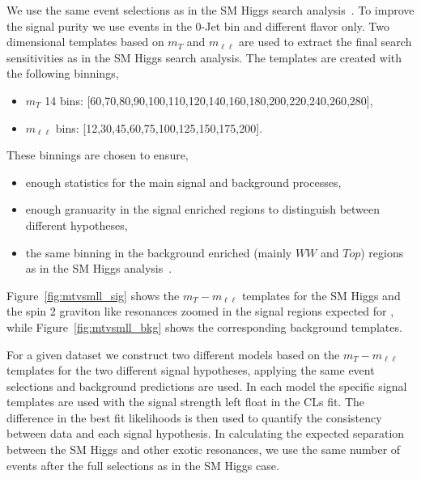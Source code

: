 We use the same event selections as in the SM Higgs search 
analysis~\cite{HWWHCP2012}. To improve the signal purity 
we use events in the 0-Jet bin and different flavor only. 
Two dimensional templates based on $m_T$ and $m_{\ell\ell}$ 
are used to extract the final search sensitivities as in the 
SM Higgs search analysis.
The templates are created with the following binnings,
\begin{itemize}
\item $m_T$ 14 bins: [60,70,80,90,100,110,120,140,160,180,200,220,240,260,280],
\item $m_{\ell\ell}$ bins: [12,30,45,60,75,100,125,150,175,200].
\end{itemize}
These binnings are chosen to ensure, 
\begin{itemize}
\item enough statistics for the main signal and background processes, 
\item enough granuarity in the signal enriched regions to distinguish between 
different hypotheses, 
\item the same binning in the background enriched (mainly $WW$ and $Top$) regions 
as in the SM Higgs analysis~\cite{HWWHCP2012}. 
\end{itemize}
Figure~\ref{fig:mtvsmll_sig} shows the $m_T-m_{\ell\ell}$ templates for the SM Higgs 
and the spin 2 graviton like resonances zoomed in the signal regions expected for \intlumiEightTeV, while 
Figure~\ref{fig:mtvsmll_bkg} shows the corresponding background templates. 

For a given dataset we construct two different models based on the $m_T-m_{\ell\ell}$ 
templates for the two different signal hypotheses, applying the 
same event selections and background predictions are used.  
In each model the specific signal templates are used with the 
signal strength left float in the CLs fit. 
The difference in the best fit likelihoods is then used 
to quantify the consistency between data and each signal hypothesis. 
In calculating the expected separation between the SM Higgs and other 
exotic resonances, we use the same number of events after the full selections as in 
the SM Higgs case. 

